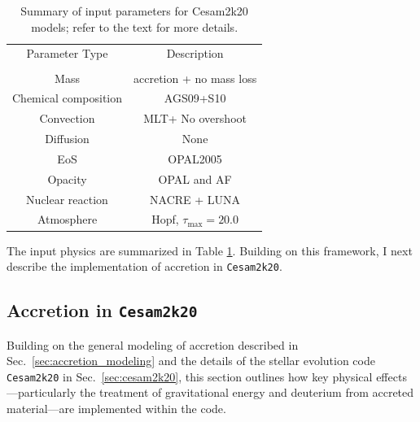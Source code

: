 \documentclass[12pt,a4paper]{article}
\begin{document}
\begin{table}
    \hfill
    \begin{tabularx}{.8\textwidth}{|| c | c ||}
        \cline{1-2}
        Parameter Type & Description \\ \cline{1-2}\\[-1em]\cline{1-2}
        Mass & accretion + no mass loss\\ \cline{1-2}
        Chemical composition  & AGS09+S10\footnotemark[1]\\ \cline{1-2}
        Convection & MLT\footnotemark[2] + No overshoot\\ \cline{1-2}
        Diffusion & None \\ \cline{1-2}
        EoS & OPAL2005\footnotemark[3] \\ \cline{1-2}
        Opacity & OPAL and AF \footnotemark[4]\\ \cline{1-2}
        Nuclear reaction & NACRE + LUNA\footnotemark[5]\\ \cline{1-2}
        Atmosphere & Hopf\footnotemark[6], $\tau_{\max} = 20.0$\\ \cline{1-2}
    \end{tabularx}
    \caption{Summary of input parameters for Cesam2k20 models; refer to the text for more details.} \label{tab:input_physics}
    \hfill
\end{table}

The input physics are summarized in Table \ref{tab:input_physics}. Building on this framework, I next describe the implementation of accretion in \texttt{Cesam2k20}.

\subsection{Accretion in \texttt{Cesam2k20}}
\label{sec:accretion_cesam2k20}

Building on the general modeling of accretion described in Sec.~\ref{sec:accretion_modeling} and the details of the stellar evolution code \texttt{Cesam2k20} in Sec.~\ref{sec:cesam2k20}, this section outlines how key physical effects—particularly the treatment of gravitational energy and deuterium from accreted material—are implemented within the code.
\end{document}
